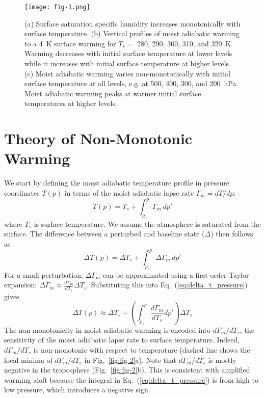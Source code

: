 \documentclass[draft,twocol]{ametsocV6.1}
\begin{document}
\begin{figure}[htbp]
 \centering
 \texttt{[image: fig-1.png]}\\
\caption{(a) Surface saturation specific humidity increases monotonically with surface temperature. (b) Vertical profiles of moist adiabatic warming to a 4~K surface warming for $T_s = $ 280, 290, 300, 310, and 320~K. Warming decreases with initial surface temperature at lower levels while it increases with initial surface temperature at higher levels. (c) Moist adiabatic warming varies non-monotonically with initial surface temperature at all levels, e.g. at 500, 400, 300, and 200~hPa. Moist adiabatic warming peaks at warmer initial surface temperatures at higher levels.}
\label{fig:fig-1}
\end{figure}

\section{Theory of Non-Monotonic Warming}
We start by defining the moist adiabatic temperature profile in pressure coordinates $T(p)$ in terms of the moist adiabatic lapse rate $\Gamma_m = dT/dp$:
\begin{equation}
T(p) = T_s + \int_{p_s}^{p} \Gamma_m \, dp' \label{eq:temp_profile_pressure}
\end{equation}
where $T_s$ is surface temperature. We assume the atmosphere is saturated from the surface. The difference between a perturbed and baseline state ($\Delta$) then follows as
\begin{equation}
\Delta T(p) = \Delta T_s + \int_{p_s}^{p} \Delta\Gamma_m \, dp' \label{eq:delta_t_pressure}
\end{equation}
For a small perturbation, $\Delta \Gamma_m$ can be approximated using a first-order Taylor expansion: $\Delta\Gamma_m \approx \frac{d\Gamma_m}{dT_s}\Delta T_s$. Substituting this into Eq.~(\ref{eq:delta_t_pressure}) gives
\begin{equation}
\Delta T(p) \approx \Delta T_s + \left(\int_{p_s}^{p} \frac{d\Gamma_m}{dT_s}dp'\right)\Delta T_s \label{eq:delta_t_taylor_pressure}
\end{equation}
The non-monotonicity in moist adiabatic warming is encoded into $d\Gamma_m/dT_s$, the sensitivity of the moist adiabatic lapse rate to surface temperature. Indeed, $d\Gamma_m/dT_s$ is non-monotonic with respect to temperature (dashed line shows the local minima of $d\Gamma_m/dT_s$ in Fig.~\ref{fig:fig-2}a). Note that $d\Gamma_m/dT_s$ is mostly negative in the troposphere (Fig.~\ref{fig:fig-2}b). This is consistent with amplified warming aloft because the integral in Eq.~(\ref{eq:delta_t_pressure}) is from high to low pressure, which introduces a negative sign.
\end{document}
